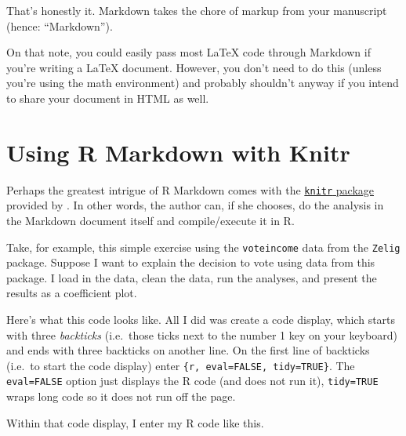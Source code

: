 \documentclass[11pt,]{article}
\begin{document}
That's honestly it. Markdown takes the chore of markup from your
manuscript (hence: ``Markdown'').

On that note, you could easily pass most LaTeX code through Markdown if
you're writing a LaTeX document. However, you don't need to do this
(unless you're using the math environment) and probably shouldn't anyway
if you intend to share your document in HTML as well.

\hypertarget{using-r-markdown-with-knitr}{%
\section{Using R Markdown with
Knitr}\label{using-r-markdown-with-knitr}}

Perhaps the greatest intrigue of R Markdown comes with the
\href{http://yihui.name/knitr/}{\texttt{knitr} package} provided by
\citet{xie2013ddrk}. In other words, the author can, if she chooses, do
the analysis in the Markdown document itself and compile/execute it in
R.

Take, for example, this simple exercise using the \texttt{voteincome}
data from the \texttt{Zelig} package. Suppose I want to explain the
decision to vote using data from this package. I load in the data, clean
the data, run the analyses, and present the results as a coefficient
plot.

Here's what this code looks like. All I did was create a code display,
which starts with three \emph{backticks} (i.e.~those ticks next to the
number 1 key on your keyboard) and ends with three backticks on another
line. On the first line of backticks (i.e.~to start the code display)
enter \texttt{\{r,\ eval=FALSE,\ tidy=TRUE\}}. The \texttt{eval=FALSE}
option just displays the R code (and does not run it),
\texttt{tidy=TRUE} wraps long code so it does not run off the page.

Within that code display, I enter my R code like this.
\end{document}
